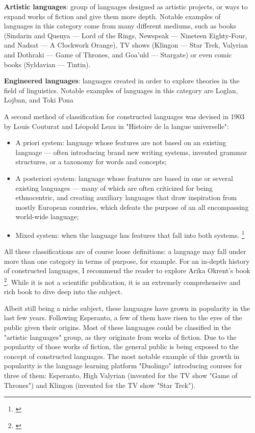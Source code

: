 \textbf{Artistic languages}: group of languages designed as artistic projects, or ways to expand works of fiction and give them more depth. Notable examples of languages
in this category come from many different mediums, such as books (Sindarin and Quenya --- Lord of the Rings, Newspeak --- Nineteen Eighty-Four, and  Nadsat --- A Clockwork Orange),
TV shows (Klingon --- Star Trek, Valyrian and Dothraki --- Game of Thrones, and Goa'uld --- Stargate) or even comic books (Syldavian --- Tintin).\newline

\textbf{Engineered languages}: languages created in order to explore theories in the field of linguistics. Notable examples of languages in this category are Loglan, Lojban, and Toki Pona\newline

A second method of classification for constructed languages was devised in 1903 by Louis Couturat and Léopold Leau in "Histoire de la langue universelle":

\begin{itemize}
    \setlength\itemsep{-0.5em}
    \item A priori system: language whose features are not based on an existing language --- often introducing brand new writing systems, invented grammar structures,
    or a taxonomy for words and concepts;
    \item A posteriori system: language whose features are based in one or several existing languages --- many of which are often criticized for being ethnocentric, and
    creating auxiliary languages that draw inspiration from mostly European countries, which defeats the purpose of an all encompassing world-wide language;
    \item Mixed system: when the language has features that fall into both systems. \footnote{\cite[Introduction, Pages XXVII and XXVIII]{couturat1903histoire}}
\end{itemize}

All these classifications are of course loose definitions: a language may fall under more than one category in terms of purpose, for example. For an in-depth history of
constructed languages, I recommend the reader to explore Arika Okrent's book \footnote{\cite{okrent2009land}}. While it is not a scientific publication, it is an extremely
comprehensive and rich book to dive deep into the subject.\newline

\vspace{-0.05cm}
Albeit still being a niche subject, these languages have grown in popularity in the last few years. Following Esperanto, a few of them have risen to the eyes of the public
given their origins. Most of these languages could be classified in the "artistic languages" group, as they originate from works of fiction. Due to the popularity of those works of
fiction, the general public is being exposed to the concept of constructed languages. The most notable example of this growth in popularity is the language learning platform
"Duolingo" introducing courses for three of them: Esperanto, High Valyrian (invented for the TV show "Game of Thrones") and Klingon (invented for the TV show "Star Trek"). \newline

